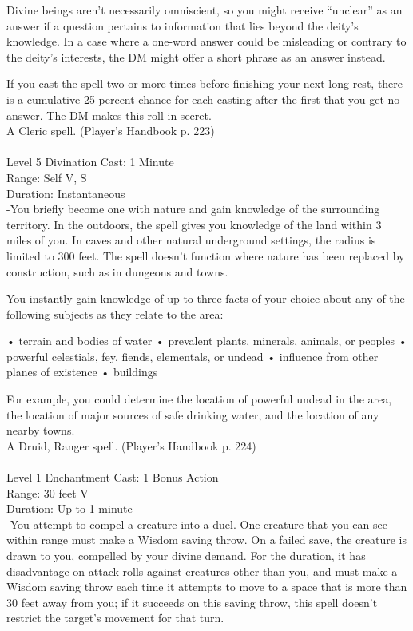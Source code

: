 \documentclass[10pt,twocolumn]{report}
\begin{document}
Divine beings aren’t necessarily omniscient, so you might receive “unclear” as an answer if a question pertains to information that lies beyond the deity’s knowledge. In a case where a one-word answer could be misleading or contrary to the deity’s interests, the DM might offer a short phrase as an answer instead. 

If you cast the spell two or more times before finishing your next long rest, there is a cumulative 25 percent chance for each casting after the first that you get no answer. The DM makes this roll in secret.\\
A Cleric spell. (Player's Handbook p. 223) \\


 \\
Level 5 \quad Divination \quad Cast: 1 Minute\\
Range: Self \quad V, S\\
Duration: Instantaneous \quad \\
-You briefly become one with nature and gain knowledge of the surrounding territory. 
In the outdoors, the spell gives you knowledge of the land within 3 miles of you. In caves and other natural underground settings, the radius is limited to 300 feet. The spell doesn’t function where nature has been replaced by construction, such as in dungeons and towns. 

You instantly gain knowledge of up to three facts of your choice about any of the following subjects as they relate to the area: 

•  terrain and bodies of water 
•  prevalent plants, minerals, animals, or peoples 
•  powerful celestials, fey, fiends, elementals, or undead 
•  influence from other planes of existence 
•  buildings 

For example, you could determine the location of powerful undead in the area, the location of major sources of safe drinking water, and the location of any nearby towns.\\
A Druid, Ranger spell. (Player's Handbook p. 224) \\


 \\
Level 1 \quad Enchantment \quad Cast: 1 Bonus Action\\
Range: 30 feet \quad V\\
Duration: Up to 1 minute \quad \\
-You attempt to compel a creature into a duel. 
One creature that you can see within range must make a Wisdom saving throw. On a failed save, the creature is drawn to you, compelled by your divine demand. For the duration, it has disadvantage on attack rolls against creatures other than you, and must make a Wisdom saving throw each time it attempts to move to a space that is more than 30 feet away from you; if it succeeds on this saving throw, this spell doesn’t restrict the target’s movement for that turn. 
\end{document}
